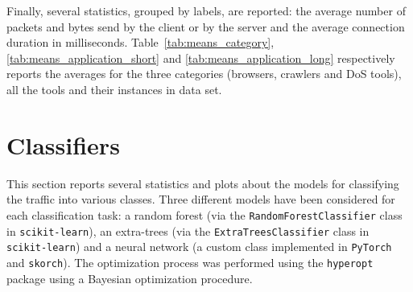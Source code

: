 \documentclass[times,review]{article}
\begin{document}
Finally, several statistics, grouped by labels, are reported: the average number of packets and bytes send by the client or by the server and the average connection duration in milliseconds.
Table~\ref{tab:means_category}, \ref{tab:means_application_short} and \ref{tab:means_application_long} respectively
reports the averages for the three categories (browsers, crawlers and DoS tools), all the tools and their instances in data set.




\section*{Classifiers}

This section reports several statistics and plots about the models for classifying the traffic into various classes.
%
Three different models have been considered for each classification task: a random forest (via the
\texttt{RandomForestClassifier} class in \texttt{scikit-learn}), an extra-trees (via the \texttt{ExtraTreesClassifier}
class in \texttt{scikit-learn}) and a neural network (a custom class implemented in \texttt{PyTorch} and
\texttt{skorch}).
The optimization process was performed using the \texttt{hyperopt} package using a Bayesian
optimization procedure.
\end{document}
